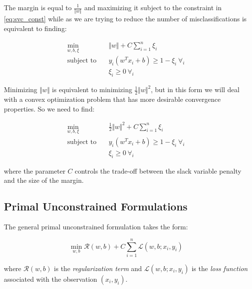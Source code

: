 The margin is equal to $\displaystyle \frac{1}{\Vert w\Vert}$ and maximizing it subject to the constraint in \ref{eq:svc_const} while as we are trying to reduce the number of misclassifications is equivalent to finding:

\begin{equation} \label{eq:svc_obj}
    \begin{aligned}
        \min_{w,b,\xi} \quad & \Vert w \Vert + C \sum_{i=1}^{n} \xi_i \\
            \textrm{subject to} \quad & y_i (w^T x_i + b) \geq 1 - \xi_i \ \forall_i \\ & \xi_i \geq 0 \ \forall_i
    \end{aligned}
\end{equation}

Minimizing $\Vert w\Vert$ is equivalent to minimizing $\displaystyle \frac{1}{2}\Vert w\Vert^{2}$, but in this form we will deal with a convex optimization problem that has more desirable convergence properties. So we need to find:

\begin{equation} \label{eq:quad_svc_obj}
    \begin{aligned}
        \min_{w,b,\xi} \quad & \frac{1}{2} \Vert w \Vert^2 + C \sum_{i=1}^{n} \xi_i \\
            \textrm{subject to} \quad & y_i (w^T x_i + b) \geq 1 - \xi_i \ \forall_i \\ & \xi_i \geq 0 \ \forall_i
    \end{aligned}
\end{equation}

where the parameter $C$ controls the trade-off between the slack variable penalty and the size of the margin.

\subsection{Primal Unconstrained Formulations}

The general primal unconstrained formulation takes the form:

\begin{equation} \label{eq:primal_svc}
    \min_{w,b} \mathcal{R}(w,b) + C \sum_{i=1}^n \mathcal{L}(w,b;x_i,y_i)
\end{equation}

where $\mathcal{R}(w, b)$ is the \emph{regularization term} and $\mathcal{L}(w,b;x_i,y_i)$ is the \emph{loss function} associated with the observation $(x_i,y_i)$.

